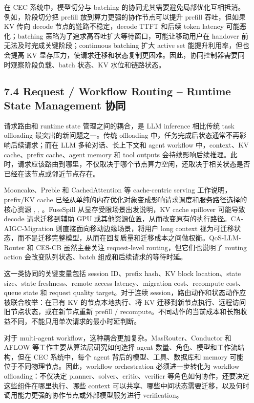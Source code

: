 在 CEC 系统中，模型切分与 batching 的协同尤其需要避免局部优化互相抵消。例如，阶段切分把 prefill 放到算力更强的协作节点可以提升 prefill 吞吐，但如果 KV 传向 decode 节点的链路不稳定，decode TTFT 和后续 token latency 可能恶化；batching 策略为了追求高吞吐扩大等待窗口，可能让移动用户在 handover 前无法及时完成关键阶段；continuous batching 扩大 active set 能提升利用率，但也会提高 KV 显存压力，使请求迁移和状态复制更困难。因此，协同控制器需要同时观察阶段负载、batch 状态、KV 水位和链路状态。


\subsection*{7.4 Request / Workflow Routing -- Runtime State Management 协同}

请求路由和 runtime state 管理之间的耦合，是 LLM inference 相比传统 task offloading 最突出的新问题之一。传统 offloading 中，任务完成后状态通常不再影响后续请求；而在 LLM 多轮对话、长上下文和 agent workflow 中，context、KV cache、prefix cache、agent memory 和 tool outputs 会持续影响后续推理。此时，请求应该路由到哪里，不仅取决于哪个节点算力空闲，还取决于相关状态是否已经在该节点或邻近节点存在。

Mooncake、Preble 和 CachedAttention 等 cache-centric serving 工作说明，prefix/KV cache 已经从单纯的内存优化对象变成影响请求调度和服务路径选择的核心资源 \cite{qin2025mooncake}, \cite{srivatsa2025preble}, \cite{gao2024cost}。FuseSpill \cite{jiang2025efficient} 从显存受限场景出发说明，KV cache spillover 可能导致 decode 请求迁移到辅助 GPU 或其他资源位置，从而改变原有的执行路径。CA-AIGC-Migration \cite{wang2026context} 则直接面向移动边缘场景，将用户 long context 视为可迁移状态，而不是迁移完整模型，从而在回复质量和迁移成本之间做权衡。QoS-LLM-Router \cite{yang2025quality} 和 CES-CB \cite{li2025cloud} 虽然主要关注 request-level routing，但它们也说明了 routing action 会改变队列状态、batch 组成和后续请求的等待时延。

这一类协同的关键变量包括 session ID、prefix hash、KV block location、state size、state freshness、remote access latency、migration cost、recompute cost、queue state 和 request quality target。对于连续 session，路由动作和状态动作应被联合枚举：在已有 KV 的节点本地执行、将 KV 迁移到新节点执行、远程访问旧节点状态，或在新节点重新 prefill / recompute。不同动作的当前成本和长期收益不同，不能只用单次请求的最小时延判断。

对于 multi-agent workflow，这种耦合更加复杂。MasRouter、Conductor 和 AFLOW 等工作主要从算法层研究如何选择 agent 数量、角色、模型和工作流结构，但在 CEC 系统中，每个 agent 背后的模型、工具、数据库和 memory 可能位于不同物理节点。因此，workflow orchestration 必须进一步转化为 workflow offloading：不仅决定 planner、solver、critic、verifier 等角色如何协作，还要决定这些组件在哪里执行、哪些 context 可以共享、哪些中间状态需要迁移，以及何时调用能力更强的协作节点或外部模型服务进行 verification。


